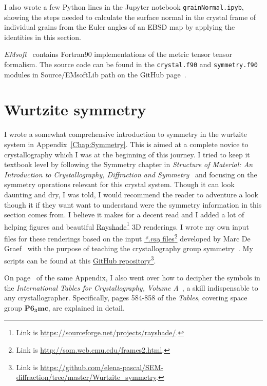 I also wrote a few Python lines in the Jupyter notebook \texttt{grainNormal.ipyb}, showing the steps needed to calculate the surface normal in the crystal frame of individual grains from the Euler angles of an EBSD map by applying the identities in this section. 
 
\emph{EMsoft}~\cite{EMsoftpaper} contains Fortran90 implementations of the metric tensor tensor formalism. The source code can be found in the \texttt{crystal.f90} and \texttt{symmetry.f90} modules in Source/EMsoftLib path on the GitHub page~\cite{EMsoft}.

\pagebreak

\section{Wurtzite symmetry}
\label{sec:Wsymmetry}
I wrote a somewhat comprehensive introduction to symmetry in the wurtzite system in Appendix~\ref{Chap:Symmetry}. This is aimed at a complete novice to crystallography which I was at the beginning of this journey. I tried to keep it textbook level by following the Symmetry chapter in \textit{Structure of Material: An Introduction to Crystallography, Diffraction and Symmetry}~\cite{SoM} and focusing on the symmetry operations relevant for this crystal system. Though it can look daunting and dry, I was told, I would recommend the reader to adventure a look though it if they want want to understand were the symmetry information in this section comes from. I believe it makes for a decent read and I added a lot of helping figures and beautiful  \href{https://sourceforge.net/projects/rayshade/}{Rayshade}\footnote{ Link is \href{https://sourceforge.net/projects/rayshade/}{https://sourceforge.net/projects/rayshade/}.} 3D renderings. I wrote my own input files for these renderings based on the input  \href{http://som.web.cmu.edu/frames2.html}{\emph{*.ray} files}\footnote{ Link is \href{http://som.web.cmu.edu/frames2.html.}{http://som.web.cmu.edu/frames2.html}.} developed by Marc De Graef~\cite{DeGraef98} with the purpose of teaching the crystallography group symmetry~\cite{teachingPointGroup}. My scripts can be found at this \href{https://github.com/elena-pascal/SEM-diffraction/tree/master/Wurtzite_symmetry/}{GitHub repository}\footnote{ Link is \href{https://github.com/elena-pascal/SEM-diffraction/tree/master/Wurtzite_symmetry}{https://github.com/elena-pascal/SEM-diffraction/tree/master/Wurtzite\_symmetry}.}. 

On page~\pageref{chap:int} of the same Appendix, I also went over how to decipher the symbols in the \textit{ International Tables for Crystallography, Volume A}~\cite{IntTableCrysA}, a skill indispensable to any crystallographer. Specifically, pages 584-858 of the \textit{Tables}, covering space group $\mathbf{P6_3mc}$, are explained in detail.

